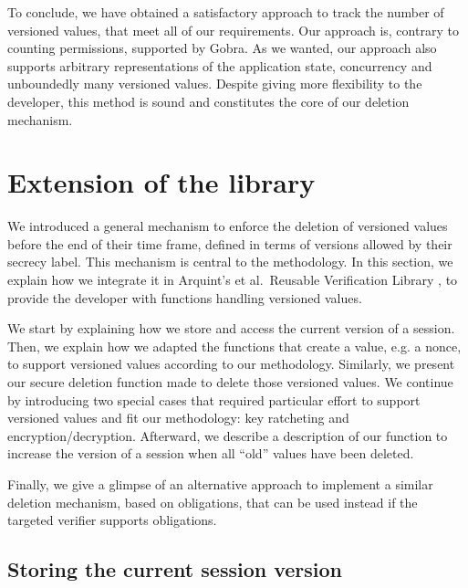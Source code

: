 To conclude, we have obtained a satisfactory approach to track the number of versioned values, that meet all of our requirements.
Our approach is, contrary to counting permissions, supported by Gobra.
As we wanted, our approach also supports arbitrary representations of the application state, concurrency and unboundedly many versioned values.
Despite giving more flexibility to the developer, this method is sound and constitutes the core of our deletion mechanism.

\section{Extension of the library}
\label{sec:extension-of-the-library}

We introduced a general mechanism to enforce the deletion of versioned values before the end of their time frame, defined in terms of versions allowed by their secrecy label.
This mechanism is central to the methodology.
In this section, we explain how we integrate it in Arquint's et al.\ Reusable Verification Library \cite{}, to provide the developer with functions handling versioned values.

We start by explaining how we store and access the current version of a session.
Then, we explain how we adapted the functions that create a value, e.g. a nonce, to support versioned values according to our methodology.
Similarly, we present our secure deletion function made to delete those versioned values.
We continue by introducing two special cases that required particular effort to support versioned values and fit our methodology: key ratcheting and encryption/decryption. 
Afterward, we describe a description of our function to increase the version of a session when all “old” values have been deleted.

Finally, we give a glimpse of an alternative approach to implement a similar deletion mechanism, based on obligations, that can be used instead if the targeted verifier supports obligations.

\subsection{Storing the current session version}
\label{sec:storing-the-current-session-version}

